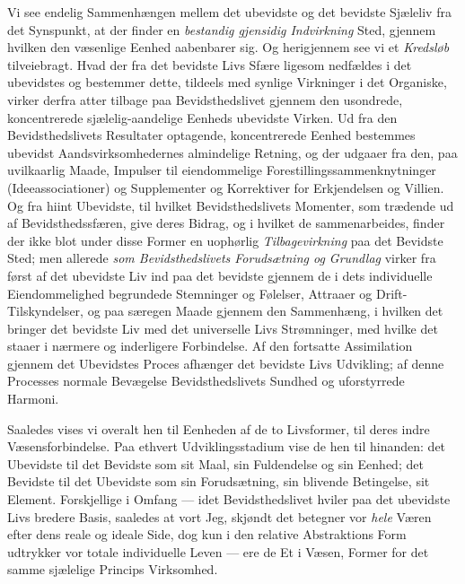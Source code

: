 \documentclass[12pt,a4paper,openany]{book}
\newcommand{\opage}[1]{\marginnote{\footnotesize\textit{[#1]}}}
\begin{document}
\opage{51}Vi see endelig Sammenhængen mellem det ubevidste og
det bevidste Sjæleliv fra det Synspunkt, at der finder en \emph{bestandig
gjensidig Indvirkning} Sted, gjennem hvilken
den væsenlige Eenhed aabenbarer sig. Og herigjennem see
vi et \emph{Kredsløb} tilveiebragt. Hvad der fra det bevidste
Livs Sfære ligesom nedfældes i det ubevidstes og bestemmer
dette, tildeels med synlige Virkninger i det Organiske, virker
derfra atter tilbage paa Bevidsthedslivet gjennem den usondrede,
koncentrerede sjælelig-aandelige Eenheds ubevidste Virken.
Ud fra den Bevidsthedslivets Resultater optagende, koncentrerede
Eenhed bestemmes ubevidst Aandsvirksomhedernes almindelige
Retning, og der udgaaer fra den, paa uvilkaarlig
Maade, Impulser til eiendommelige Forestillingssammenknytninger
(Ideeassociationer) og Supplementer og Korrektiver for
Erkjendelsen og Villien. Og fra hiint Ubevidste, til hvilket
Bevidsthedslivets Momenter, som trædende ud af Bevidsthedssfæren,
give deres Bidrag, og i hvilket de sammenarbeides,
finder der ikke blot under disse Former en uophørlig \emph{Tilbagevirkning}
paa det Bevidste Sted; men allerede \emph{som
Bevidsthedslivets Forudsætning og Grundlag} virker
fra først af det ubevidste Liv ind paa det bevidste gjennem
de i dets individuelle Eiendommelighed begrundede Stemninger
og Følelser, Attraaer og Drift-Tilskyndelser, og paa særegen
Maade gjennem den Sammenhæng, i hvilken det bringer det
bevidste Liv med det universelle Livs Strømninger, med
hvilke det staaer i nærmere og inderligere Forbindelse. Af
den fortsatte Assimilation gjennem det Ubevidstes Proces afhænger
det bevidste Livs Udvikling; af denne Processes normale
Bevægelse Bevidsthedslivets Sundhed og uforstyrrede Harmoni.

Saaledes vises vi overalt hen til Eenheden af de to
Livsformer, til deres indre Væsensforbindelse. Paa ethvert
Udviklingsstadium vise de hen til hinanden: det Ubevidste til
det Bevidste som sit Maal, sin Fuldendelse og sin Eenhed;
det Bevidste til det Ubevidste som sin Forudsætning, sin blivende
Betingelse, sit Element. Forskjellige i Omfang --- idet Bevidsthedslivet
hviler paa det ubevidste Livs bredere Basis, saaledes
\opage{52}at vort Jeg, skjøndt det betegner vor \emph{hele} Væren efter dens
reale og ideale Side, dog kun i den relative Abstraktions
Form udtrykker vor totale individuelle Leven --- ere de Et i
Væsen, Former for det samme sjælelige Princips Virksomhed.
\end{document}
